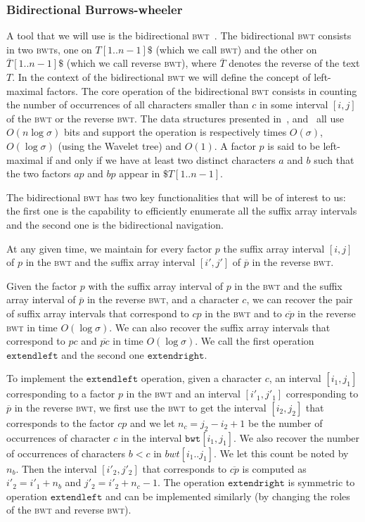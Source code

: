 \documentclass[a4paper]{article}
\begin{document}
\subsubsection{Bidirectional Burrows-wheeler}
A tool that we will use is the bidirectional \textsc{bwt}~\cite{LYLLYKW09,SOG12}. 
The bidirectional \textsc{bwt} consists in two \textsc{bwt}s, one on $T[1..n-1]\$$ (which we call \textsc{bwt}) and the other on $\overline{T}[1..n-1]\$$ (which we call reverse \textsc{bwt}), where $\overline{T}$ denotes the reverse of the text $T$. In the context of the bidirectional \textsc{bwt} we will define the concept of left-maximal factors. 
The core operation of the bidirectional \textsc{bwt} consists in counting the number of occurrences of all characters smaller than $c$ in some interval $[i,j]$ of the \textsc{bwt} or the reverse \textsc{bwt}. The data structures presented in~\cite{LYLLYKW09}, \cite{SOG12} and~\cite{BCKM13} all use $O(n\log\sigma)$ bits and support the operation is respectively times $O(\sigma)$, $O(\log\sigma)$ (using the Wavelet tree) and $O(1)$. 
A factor $p$ is said to be left-maximal if and only if we have at least two distinct characters $a$ and $b$ such that the two factors $ap$ and $bp$ appear in $\$T[1..n-1]$. 

The bidirectional \textsc{bwt} has two key functionalities that will be of interest to us: the first one is the capability to efficiently enumerate all the suffix array intervals and the second one is the bidirectional navigation. 

At any given time, we maintain for every factor $p$ the suffix array interval $[i,j]$ of $p$ in the \textsc{bwt} and the suffix array interval $[i',j']$ of $\overline{p}$ in the reverse \textsc{bwt}. 

Given the factor $p$ with the suffix array interval of $p$ in the \textsc{bwt} and the suffix array interval of $\overline{p}$ in the reverse \textsc{bwt}, and a character $c$, we can recover the pair of suffix array intervals that correspond to $cp$ in the \textsc{bwt} and to $\overline{cp}$ in the reverse \textsc{bwt} in time $O(\log\sigma)$. We can also recover the suffix array intervals that correspond to $pc$ and $\overline{pc}$ in time $O(\log\sigma)$. We call the first operation $\mathtt{extendleft}$ and the second one $\mathtt{extendright}$. 

To implement the $\mathtt{extendleft}$ operation, given a character $c$, an interval $[i_1,j_1]$ corresponding to a factor $p$ in the \textsc{bwt} and an interval $[i'_1,j'_1]$ corresponding to $\overline{p}$ in the reverse \textsc{bwt}, we first use the \textsc{bwt} to get the interval $[i_2,j_2]$ that corresponds to the factor $cp$ and we let $n_c=j_2-i_2+1$ be the number of occurrences of character $c$ in the interval $\mathtt{bwt}[i_1,j_1]$. We also recover the number of occurrences of characters $b<c$ in $bwt[i_1..j_1]$. We let this count be noted by $n_b$. Then the interval $[i'_2,j'_2]$ that corresponds to $\overline{cp}$ is computed as $i'_2=i'_1+n_b$ and $j'_2=i'_2+n_c-1$. 
The operation $\mathtt{extendright}$ is symmetric to operation $\mathtt{extendleft}$ and can be implemented similarly (by changing the roles of the \textsc{bwt} and reverse \textsc{bwt}). 
\end{document}
